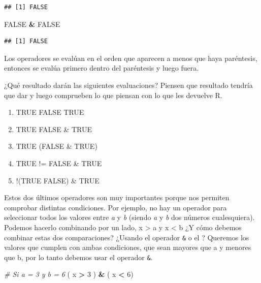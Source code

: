\documentclass[]{book}
\newenvironment{Shaded}{\begin{snugshade}}{\end{snugshade}}
\newcommand{\CommentTok}[1]{\textcolor[rgb]{0.56,0.35,0.01}{\textit{#1}}}
\newcommand{\DecValTok}[1]{\textcolor[rgb]{0.00,0.00,0.81}{#1}}
\newcommand{\NormalTok}[1]{#1}
\newcommand{\OperatorTok}[1]{\textcolor[rgb]{0.81,0.36,0.00}{\textbf{#1}}}
\newcommand{\OtherTok}[1]{\textcolor[rgb]{0.56,0.35,0.01}{#1}}
\newcommand{\StringTok}[1]{\textcolor[rgb]{0.31,0.60,0.02}{#1}}
\providecommand{\tightlist}{%
  \setlength{\itemsep}{0pt}\setlength{\parskip}{0pt}}
\theoremstyle{definition}
\theoremstyle{definition}
\theoremstyle{definition}
\theoremstyle{remark}
\let\BeginKnitrBlock\begin \let\EndKnitrBlock\end
\begin{document}
\begin{verbatim}
## [1] FALSE
\end{verbatim}

\begin{Shaded}
\begin{Highlighting}[]
\OtherTok{FALSE} \OperatorTok{&}\StringTok{ }\OtherTok{FALSE}
\end{Highlighting}
\end{Shaded}

\begin{verbatim}
## [1] FALSE
\end{verbatim}

Los operadores se evalúan en el orden que aparecen a menos que haya
paréntesis, entonces se evalúa primero dentro del paréntesis y luego
fuera.

\BeginKnitrBlock{exercise}
\protect\hypertarget{exr:ejercicio-6}{}{\label{exr:ejercicio-6} }¿Qué
resultado darán las siguientes evaluaciones? Piensen que resultado
tendría que dar y luego comprueben lo que piensan con lo que les
devuelve R.

\begin{enumerate}
\def\labelenumi{\arabic{enumi}.}
\tightlist
\item
  TRUE \textbar{} FALSE \textbar{} TRUE
\item
  TRUE \textbar{} FALSE \& TRUE
\item
  TRUE \textbar{} (FALSE \& TRUE)
\item
  TRUE != FALSE \& TRUE
\item
  !(TRUE \textbar{} FALSE) \& TRUE
\end{enumerate}
\EndKnitrBlock{exercise}

Estos dos últimos operadores son muy importantes porque nos permiten
comprobar distintas condiciones. Por ejemplo, no hay un operador para
seleccionar todos los valores entre \emph{a} y \emph{b} (siendo \emph{a}
y \emph{b} dos números cualesquiera). Podemos hacerlo combinando por un
lado, x \textgreater{} a y x \textless{} b ¿Y cómo debemos combinar
estas dos comparaciones? ¿Usando el operador \texttt{\&} o el
\texttt{\textbar{}}? Queremos los valores que cumplen con ambas
condiciones, que sean mayores que a y menores que b, por lo tanto
debemos usar el operador \texttt{\&}.

\begin{Shaded}
\begin{Highlighting}[]
\CommentTok{# Si a = 3 y b = 6}
\NormalTok{( x }\OperatorTok{>}\StringTok{ }\DecValTok{3}\NormalTok{ ) }\OperatorTok{&}\StringTok{ }\NormalTok{( x }\OperatorTok{<}\StringTok{ }\DecValTok{6}\NormalTok{)}
\end{Highlighting}
\end{Shaded}
\end{document}
